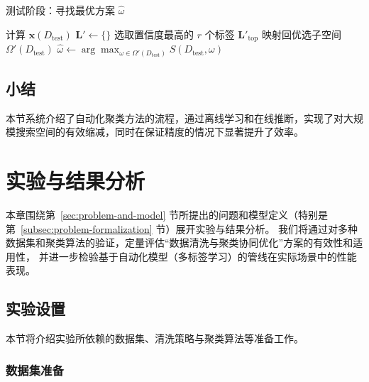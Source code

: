 \documentclass[10pt]{article} %
\numberwithin{equation}{section}
\begin{document}
\begin{algorithm}[H]
\caption{测试阶段：寻找最优方案 \(\hat{\omega}\)}
\label{alg:test-phase}

计算 $\mathbf{x}(D_{\text{test}})$\;
$\mathbf{L}' \leftarrow \{\}$\;
选取置信度最高的 $r$ 个标签 $\mathbf{L}'_{\mathrm{top}}$\;
映射回优选子空间 $\Omega'(D_{\text{test}})$\;
$\hat{\omega} \leftarrow \arg\max_{\omega \in \Omega'(D_{\text{test}})}S(D_{\text{test}}, \omega)$\;
\KwRet{$\hat{\omega}$}
\end{algorithm}

\subsection{小结}
本节系统介绍了自动化聚类方法的流程，通过离线学习和在线推断，实现了对大规模搜索空间的有效缩减，同时在保证精度的情况下显著提升了效率。


\section{实验与结果分析}
\label{sec:chapter5}

本章围绕第~\ref{sec:problem-and-model} 节所提出的问题和模型定义（特别是第~\ref{subsec:problem-formalization} 节）展开实验与结果分析。
我们将通过对多种数据集和聚类算法的验证，定量评估“数据清洗与聚类协同优化”方案的有效性和适用性，
并进一步检验基于自动化模型（多标签学习）的管线在实际场景中的性能表现。

\subsection{实验设置}
\label{sec:exp_setting}

本节将介绍实验所依赖的数据集、清洗策略与聚类算法等准备工作。

\subsubsection{数据集准备}
\label{sec:dataset_prep}
\end{document}
